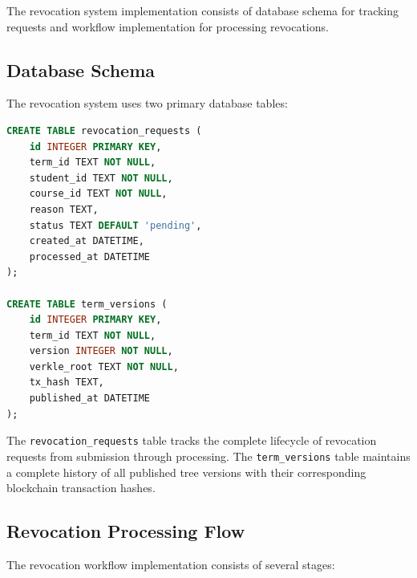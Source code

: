 The revocation system implementation consists of database schema for tracking requests and workflow implementation for processing revocations.

\subsection{Database Schema}
\label{subsec:revocation-schema}

The revocation system uses two primary database tables:

\begin{lstlisting}[language=SQL, caption=Revocation Database Schema, label=lst:revocation-schema]
CREATE TABLE revocation_requests (
    id INTEGER PRIMARY KEY,
    term_id TEXT NOT NULL,
    student_id TEXT NOT NULL,
    course_id TEXT NOT NULL,
    reason TEXT,
    status TEXT DEFAULT 'pending',
    created_at DATETIME,
    processed_at DATETIME
);

CREATE TABLE term_versions (
    id INTEGER PRIMARY KEY,
    term_id TEXT NOT NULL,
    version INTEGER NOT NULL,
    verkle_root TEXT NOT NULL,
    tx_hash TEXT,
    published_at DATETIME
);
\end{lstlisting}

The \texttt{revocation\_requests} table tracks the complete lifecycle of revocation requests from submission through processing. The \texttt{term\_versions} table maintains a complete history of all published tree versions with their corresponding blockchain transaction hashes.

\subsection{Revocation Processing Flow}
\label{subsec:revocation-processing}

The revocation workflow implementation consists of several stages:

